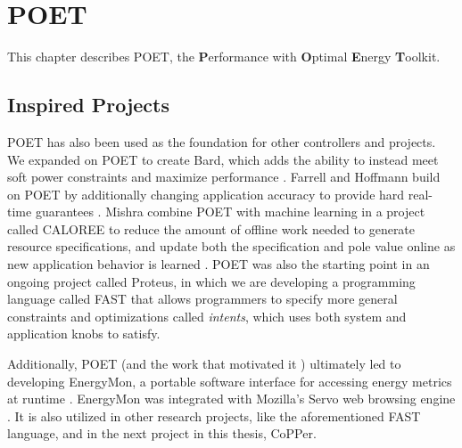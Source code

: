 \chapter{POET}
\label{sec:poet}

This chapter describes POET, the \textbf{P}erformance with \textbf{O}ptimal \textbf{E}nergy \textbf{T}oolkit.









\section{Inspired Projects}
\label{sec:poet-inspired}

POET has also been used as the foundation for other controllers and projects.
We expanded on POET to create Bard, which adds the ability to instead meet soft power constraints and maximize performance \cite{Bard}.
Farrell and Hoffmann build on POET by additionally changing application accuracy to provide hard real-time guarantees \cite{meantime}.
Mishra \etal combine POET with machine learning in a project called CALOREE to reduce the amount of offline work needed to generate resource specifications, and update both the specification and pole value online as new application behavior is learned \cite{CALOREE}.
POET was also the starting point in an ongoing project called Proteus, in which we are developing a programming language called FAST that allows programmers to specify more general constraints and optimizations called \emph{intents}, which uses both system and application knobs to satisfy.

Additionally, POET (and the work that motivated it \cite{Imes2014}) ultimately led to developing EnergyMon, a portable software interface for accessing energy metrics at runtime \cite{energymon}.
EnergyMon was integrated with Mozilla's Servo web browsing engine \cite{servo}.
It is also utilized in other research projects, like the aforementioned FAST language, and in the next project in this thesis, CoPPer.
